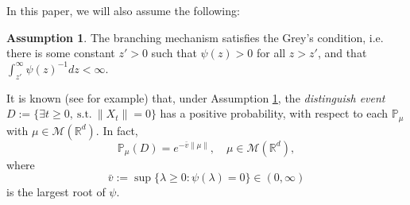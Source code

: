 \documentclass[12pt,a4paper]{amsart}
\theoremstyle{plain}
\newtheorem{lem}[thm]{Lemma}
\theoremstyle{definition}
\newtheorem{asp}{Assumption}
\numberwithin{equation}{section}
\begin{document}
	In this paper, we will also assume the following:
\begin{asp}
\label{asp: Greys condition}
	The branching mechanism satisfies the Grey's condition, i.e. there is some constant $z' > 0$ such that $\psi(z) > 0$ for all $z>z'$, and that $\int_{z'}^\infty \psi(z)^{-1}dz < \infty$.
\end{asp}

	It is known (see \cite[Theorems 12.5 \& 12.7]{Kyprianou2014Fluctuations} for example) that, under Assumption \ref{asp: Greys condition}, the \emph{distinguish event} $D:=\{\exists t\geq 0,~\text{s.t.}~\|X_t\|=0\}$ has a positive probability, with respect to each $\mathbb P_\mu$ with $\mu \in \mathcal M(\mathbb R^d)$.
    In fact,
\begin{equation}
    \mathbb{P}_{\mu} (D)
    = e^{-\bar v \|\mu\|},
    \quad \mu\in \mathcal M(\mathbb R^d),
\end{equation}
    where 
\[
	\bar v := \sup\{\lambda \geq 0: \psi(\lambda) = 0\} \in (0,\infty)
\]
	is the largest root of $\psi$.
	
\end{document}
